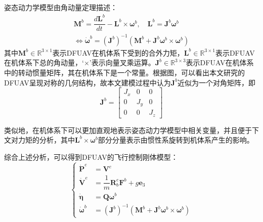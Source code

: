 姿态动力学模型由角动量定理描述：
\begin{equation}
    \begin{gathered}
    \boldsymbol{M}^{b}=\dfrac{d\boldsymbol{L}^{b}}{dt} - {\boldsymbol{L}^{b}}\times{\boldsymbol\omega^{b}},\quad \boldsymbol{L}^{b}=\boldsymbol{J}^{b}\boldsymbol\omega^{b}
    \\
    \Leftrightarrow\boldsymbol{\dot{\omega}}^b=(\boldsymbol{J}^b)^{-1}(\boldsymbol{M}^b+\boldsymbol{J}^b\boldsymbol{\omega}^b\times\boldsymbol{\omega}^b)
    \label{eq_8}
    \end{gathered}
\end{equation}
其中$\boldsymbol{M}^{b}\in\mathbb{R}^{3\times1}$表示DFUAV在机体系下受到的合外力矩，$\boldsymbol{L}^{b}\in\mathbb{R}^{3\times1}$表示DFUAV在机体系下总的角动量，‘$\times$’表示向量叉乘运算。$\boldsymbol{J}^{b}\in\mathbb{R}^{3\times3}$表示DFUAV在机体系中的转动惯量矩阵，其在机体系下是一个常量。根据图，可以看出本文研究的DFUAV呈现对称的几何结构，故本文建模过程中认为$\boldsymbol{J}^{b}$近似为一个对角矩阵，即
\begin{equation}
    \boldsymbol{J}^b=\begin{bmatrix}
        J_{x} & 0 & 0 \\
        0 & J_{y} & 0 \\
        0 & 0 & J_{z}
        \end{bmatrix}
    \label{eq_9}
\end{equation}

类似地，在机体系下可以更加直观地表示姿态动力学模型中相关变量，并且便于下文对力矩的分析，其中${\boldsymbol{L}^{b}}\times{\boldsymbol\omega^{b}}$部分分量表示由惯性系旋转到机体系产生的影响。

综合上述分析，可以得到DFUAV的飞行控制刚体模型：
\begin{equation}
    \left\{
    \begin{aligned}
        \boldsymbol{\dot{P}}^{e} &= \boldsymbol{V}^{e} \\
        \dot{\boldsymbol{V}}^e&=\dfrac{1}{m}\boldsymbol{R}_b^e\boldsymbol{F}^b + g\boldsymbol{e}_3 \\
        \dot{\boldsymbol{\eta}}&=\boldsymbol{Q}\boldsymbol{\omega}^b \\
        \boldsymbol{\dot{\omega}}^b&=(\boldsymbol{J}^b)^{-1}(\boldsymbol{M}^b+\boldsymbol{J}^b\boldsymbol{\omega}^b\times\boldsymbol{\omega}^b)
    \end{aligned}
    \right.
    \label{eq_10}
\end{equation}


